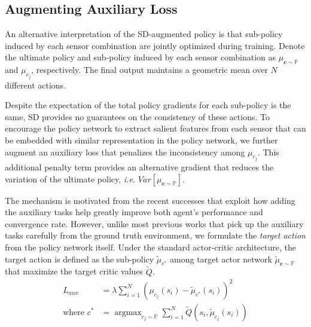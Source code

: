 \documentclass[../thesis.tex]{subfiles}
\begin{document}
\subsection{Augmenting Auxiliary Loss}

An alternative interpretation of the SD-augmented policy is that sub-policy induced by each sensor combination are jointly optimized during training. Denote the ultimate policy and sub-policy induced by each sensor combination as $\mu_{\mathbf{c}\sim \mathbb{P}}$ and $\mu_{c_j}$, respectively. The final output maintains a geometric mean over $N$ different actions. 

Despite the expectation of the total policy gradients for each sub-policy is the same, SD provides no guarantees on the consistency of these actions. 
To encourage the policy network to extract salient features from each sensor that can be embedded with similar representation in the policy network, we further augment an auxiliary loss that penalizes the inconsistency among $\mu_{c_j}$. 
This additional penalty term provides an alternative gradient that reduces the variation of the ultimate policy, \textit{i.e.} $Var \left[ \mu_{\mathbf{c}\sim \mathbb{P}} \right]$.

The mechanism is motivated from the recent successes \cite{DBLP:journals/corr/GuLGTL16,mirowski2017a,lample2016playing,dosovitskiy2016learning} that exploit how adding the auxiliary tasks help greatly improve both agent's performance and convergence rate. However, unlike most previous works that pick up the auxiliary tasks carefully from the ground truth environment, we formulate the \textit{target action} from the policy network itself. 
Under the standard actor-critic architecture, the target action is defined as the sub-policy $\tilde{\mu}_{c^{*}}$ among target actor network $\tilde{\mu}_{\mathbf{c}\sim \mathbb{P}}$ that maximize the target critic values $\tilde{Q}$.
\begin{align}
L_{aux} &= \lambda \sum_{i=1}^N (\mu_{c_j}(s_i)-\tilde{\mu}_{c^{*}}(s_i))^2 \\
\text{where  } c^{*} &= \mathop{\mathrm{argmax}}_{c_j \sim \mathbb{P}} \sum_{i=1}^N \tilde{Q}(s_i,\tilde{\mu}_{c_j}(s_i))
\end{align}
\end{document}
